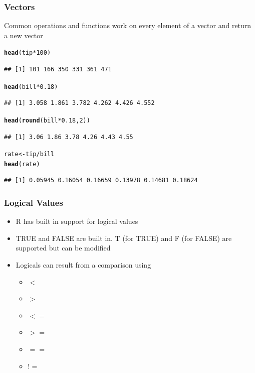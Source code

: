 \documentclass{beamer}\usepackage[]{graphicx}\usepackage[]{color}
\makeatletter
\newcommand{\hlnum}[1]{\textcolor[rgb]{0.686,0.059,0.569}{#1}}%
\newcommand{\hlopt}[1]{\textcolor[rgb]{0,0,0}{#1}}%
\newcommand{\hlstd}[1]{\textcolor[rgb]{0.345,0.345,0.345}{#1}}%
\newcommand{\hlkwb}[1]{\textcolor[rgb]{0.69,0.353,0.396}{#1}}%
\newcommand{\hlkwd}[1]{\textcolor[rgb]{0.737,0.353,0.396}{\textbf{#1}}}%
\newenvironment{kframe}{%
 \def\at@end@of@kframe{}%
 \ifinner\ifhmode%
  \def\at@end@of@kframe{\end{minipage}}%
  \begin{minipage}{\columnwidth}%
 \fi\fi%
 \def\FrameCommand##1{\hskip\@totalleftmargin \hskip-\fboxsep
 \colorbox{shadecolor}{##1}\hskip-\fboxsep
     \hskip-\linewidth \hskip-\@totalleftmargin \hskip\columnwidth}%
 \MakeFramed {\advance\hsize-\width
   \@totalleftmargin\z@ \linewidth\hsize
   \@setminipage}}%
 {\par\unskip\endMakeFramed%
 \at@end@of@kframe}
\newenvironment{knitrout}{}{} %
\makeatother
\begin{document}
\begin{frame}[fragile]
    \frametitle{Vectors}
        Common operations and functions work on every element of a vector and return a new vector
\begin{knitrout}\footnotesize
{}\color{fgcolor}\begin{kframe}
\begin{alltt}
\hlkwd{head}\hlstd{(tip} \hlopt{*} \hlnum{100}\hlstd{)}
\end{alltt}
\begin{verbatim}
## [1] 101 166 350 331 361 471
\end{verbatim}
\begin{alltt}
\hlkwd{head}\hlstd{(bill} \hlopt{*} \hlnum{0.18}\hlstd{)}
\end{alltt}
\begin{verbatim}
## [1] 3.058 1.861 3.782 4.262 4.426 4.552
\end{verbatim}
\begin{alltt}
\hlkwd{head}\hlstd{(}\hlkwd{round}\hlstd{(bill} \hlopt{*} \hlnum{0.18}\hlstd{,} \hlnum{2}\hlstd{))}
\end{alltt}
\begin{verbatim}
## [1] 3.06 1.86 3.78 4.26 4.43 4.55
\end{verbatim}
\begin{alltt}
\hlstd{rate} \hlkwb{<-} \hlstd{tip}\hlopt{/}\hlstd{bill}
\hlkwd{head}\hlstd{(rate)}
\end{alltt}
\begin{verbatim}
## [1] 0.05945 0.16054 0.16659 0.13978 0.14681 0.18624
\end{verbatim}
\end{kframe}
\end{knitrout}

\end{frame}


\begin{frame}
    \frametitle{Logical Values}
    \begin{itemize}
        \item R has built in support for logical values
        \item TRUE and FALSE are built in.  T (for TRUE) and F (for FALSE) are supported but can be modified
        \item Logicals can result from a comparison using
        \begin{itemize}
            \item $<$
            \item $>$
            \item $<=$
            \item $>=$
            \item $==$
            \item $!=$
        \end{itemize}
    \end{itemize}
\end{frame}
\end{document}
